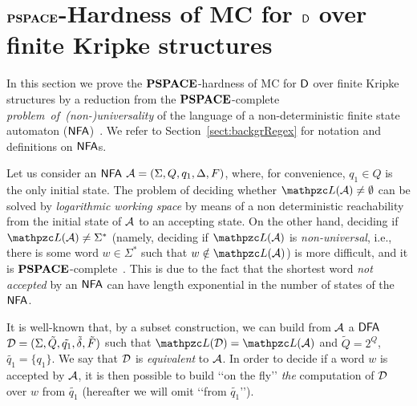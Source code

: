 \section{$\textbf{PSPACE}$-Hardness of MC for $\mathsf{D}${} over finite Kri\-pke structures}\label{sec:MChard}
In this section we prove the $\textbf{PSPACE}$-hardness of MC for $\mathsf{D}${} over finite Kripke structures
by a reduction from the $\textbf{PSPACE}$-complete \mbox{\emph{problem of (non-)universality}} of the language of a non-deterministic finite state automaton ($\text{\sffamily NFA}$)~\cite{holzer}.
We refer to Section~\ref{sect:backgrRegex} for notation and definitions on $\text{\sffamily NFA}$s. 

Let us consider an $\text{\sffamily NFA}$ 
$\mathcal{A} =(\Sigma,Q,q_1,\Delta,F)$, where, for convenience, $q_1\in Q$ is the only initial state.
The problem of deciding whether $\Lang(\Au)\neq\emptyset$ can be solved by \emph{logarithmic working space} by means of a non deterministic reachability from the initial state of $\mathcal{A}$ to an accepting state. On the other hand, deciding if $\Lang(\Au)\neq\Sigma^*$ (namely, deciding if $\Lang(\Au)$ is \emph{non-universal}, i.e., there is some word $w\in\Sigma^*$ such that $w\notin\Lang(\Au)$) is more difficult, and it is $\textbf{PSPACE}$-complete~\cite{holzer}. This is due to the fact that the shortest word \emph{not accepted} by an $\text{\sffamily NFA}$ can have length exponential in the number of states of the $\text{\sffamily NFA}$.

It is well-known that, by a subset construction, we can build from $\mathcal{A}$ a $\text{\sffamily DFA}$ $\mathcal{D}=(\Sigma,\tilde{Q},\tilde{q_1},\tilde{\delta},\tilde{F})$ such that $\Lang(\Du)=\Lang(\Au)$ and $\tilde{Q}= 2^{Q}$, $\tilde{q_1}=\{q_1\}$. We say that $\mathcal{D}$ is \emph{equivalent} to $\mathcal{A}$.
In order to decide if a word $w$ is accepted by $\mathcal{A}$, it is then possible to build \lq\lq on the fly\rq\rq{} \emph{the} computation of $\mathcal{D}$ over $w$ from $\tilde{q_1}$ (hereafter we will omit \lq\lq from $\tilde{q_1}$\rq\rq).


